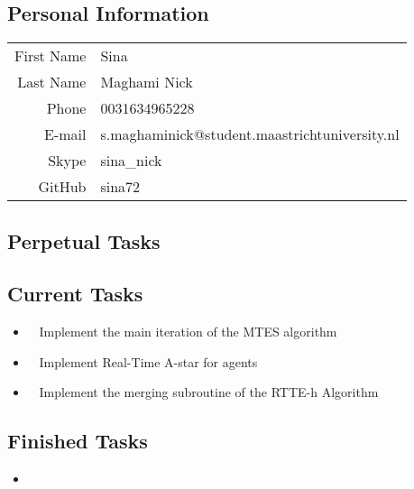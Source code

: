 \subsection{Personal Information}
\begin{table}[h!]
	\begin{tabular}{rl}
	First Name 	& Sina\\
	Last Name	& Maghami Nick\\
	Phone		& 0031634965228\\
	E-mail		& s.maghaminick@student.maastrichtuniversity.nl\\
	Skype		& sina\_nick\\
	GitHub		& sina72
\end{tabular}
\end{table}

\subsection{Perpetual Tasks}

\subsection{Current Tasks}
\begin{itemize}
	\item~
	Implement the main iteration of the MTES algorithm
	\item~
	Implement Real-Time A-star for agents
	\item~
	Implement the merging subroutine of the RTTE-h Algorithm
\end{itemize}

\subsection{Finished Tasks}
\begin{itemize}
	\item 
\end{itemize}
